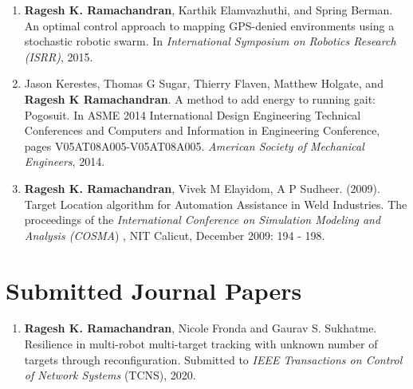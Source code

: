\documentclass[margin,line]{res}
\begin{document}
\begin{resume}
\begin{enumerate}
	\item \textbf{Ragesh K. Ramachandran}, Karthik Elamvazhuthi, and Spring Berman. An optimal control approach to mapping GPS-denied environments using a stochastic robotic swarm. In \textit{International Symposium on Robotics Research (ISRR)}, 2015.
	
	\item Jason Kerestes, Thomas G Sugar, Thierry Flaven, Matthew Holgate, and \textbf{Ragesh K Ramachandran}. A method to add energy to running gait: Pogosuit. In ASME 2014 International Design Engineering Technical Conferences and Computers and Information in Engineering Conference, pages V05AT08A005-V05AT08A005. \textit{American Society of Mechanical Engineers}, 2014.
	
	\item \textbf{Ragesh K. Ramachandran}, Vivek M Elayidom, A P Sudheer. (2009). Target Location algorithm for Automation Assistance in Weld Industries. The proceedings of the \textit{International Conference on Simulation Modeling and Analysis (COSMA}) , NIT Calicut, December 2009: 194 - 198.
	
\end{enumerate}


\section{\sc Submitted Journal Papers}
\begin{enumerate}	
	\item \textbf{Ragesh K. Ramachandran}, Nicole Fronda and Gaurav S. Sukhatme. Resilience in multi-robot multi-target tracking with unknown number of targets through reconfiguration. Submitted to \textit{IEEE Transactions on Control of Network Systems} (TCNS), 2020.
	
	
\end{enumerate}

%	
%	
%			
%	
%	



\end{resume}
\end{document}
